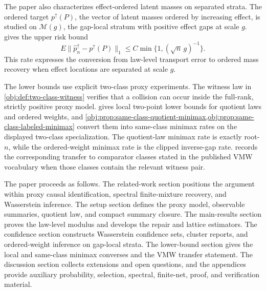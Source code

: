 The paper also characterizes effect-ordered latent masses on separated strata.  The ordered target \(p^\uparrow(P)\), the vector of latent masses ordered by increasing effect, is studied on \(\mathcal M(g)\), the gap-local stratum with positive effect gaps at scale \(g\).   gives the upper risk bound
\[
E\|\widehat p_n^\uparrow-p^\uparrow(P)\|_1
\le
C\min\{1,(\sqrt n\,g)^{-1}\}.
\]
This rate expresses the conversion from law-level transport error to ordered mass recovery when effect locations are separated at scale \(g\).

The lower bounds use explicit two-class proxy experiments.  The witness law in \cref{obj:def:two-class-witness} verifies that a collision can occur inside the full-rank, strictly positive proxy model.   gives local two-point lower bounds for quotient laws and ordered weights, and \cref{obj:prop:same-class-quotient-minimax,obj:prop:same-class-labeled-minimax} convert them into same-class minimax rates on the displayed two-class specialization.  The quotient-law minimax rate is exactly root-\(n\), while the ordered-weight minimax rate is the clipped inverse-gap rate.   records the corresponding transfer to comparator classes stated in the published VMW vocabulary when those classes contain the relevant witness pair.

The paper proceeds as follows.  The related-work section positions the argument within proxy causal identification, spectral finite-mixture recovery, and Wasserstein inference.  The setup section defines the proxy model, observable summaries, quotient law, and compact summary closure.  The main-results section proves the law-level modulus and develops the repair and lattice estimators.  The confidence section constructs Wasserstein confidence sets, cluster reports, and ordered-weight inference on gap-local strata.  The lower-bound section gives the local and same-class minimax converses and the VMW transfer statement.  The discussion section collects extensions and open questions, and the appendices provide auxiliary probability, selection, spectral, finite-net, proof, and verification material.
